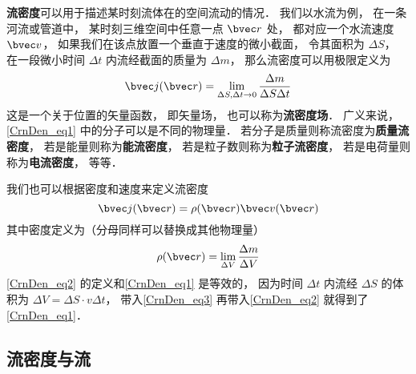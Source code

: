 

\textbf{流密度}可以用于描述某时刻流体在的空间流动的情况． 我们以水流为例， 在一条河流或管道中， 某时刻三维空间中任意一点 $\bvec r$ 处， 都对应一个水流速度 $\bvec v$， 如果我们在该点放置一个垂直于速度的微小截面， 令其面积为 $\Delta S$， 在一段微小时间 $\Delta t$ 内流经截面的质量为 $\Delta m$， 那么流密度可以用极限定义为
\begin{equation}\label{CrnDen_eq1}
\bvec j(\bvec r) = \lim_{\Delta S, \Delta t \to 0} \frac{\Delta m}{\Delta S \Delta t}
\end{equation}
这是一个关于位置的矢量函数， 即矢量场， 也可以称为\textbf{流密度场}． 广义来说， \autoref{CrnDen_eq1} 中的分子可以是不同的物理量． 若分子是质量则称流密度为\textbf{质量流密度}， 若是能量则称为\textbf{能流密度}， 若是粒子数则称为\textbf{粒子流密度}， 若是电荷量则称为\textbf{电流密度}， 等等． 

我们也可以根据密度和速度来定义流密度
\begin{equation}\label{CrnDen_eq2}
\bvec j(\bvec r) = \rho(\bvec r) \bvec v(\bvec r)
\end{equation}
其中密度定义为（分母同样可以替换成其他物理量）
\begin{equation}\label{CrnDen_eq3}
\rho(\bvec r) = \lim_{\Delta V} \frac{\Delta m}{\Delta V}
\end{equation}
\autoref{CrnDen_eq2} 的定义和\autoref{CrnDen_eq1} 是等效的， 因为时间 $\Delta t$ 内流经 $\Delta S$ 的体积为 $\Delta V = \Delta S \cdot v  \Delta t$， 带入\autoref{CrnDen_eq3} 再带入\autoref{CrnDen_eq2} 就得到了\autoref{CrnDen_eq1}．

\subsection{流密度与流}
